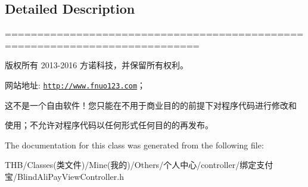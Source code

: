 \subsection{Detailed Description}
============================================================================

版权所有 2013-\/2016 方诺科技，并保留所有权利。

网站地址\+: \href{http://www.fnuo123.com}{\tt http\+://www.\+fnuo123.\+com}； 



这不是一个自由软件！您只能在不用于商业目的的前提下对程序代码进行修改和

使用；不允许对程序代码以任何形式任何目的的再发布。 

 

The documentation for this class was generated from the following file\+:\begin{DoxyCompactItemize}
\item 
T\+H\+B/\+Classes(类文件)/\+Mine(我的)/\+Others/个人中心/controller/绑定支付宝/Blind\+Ali\+Pay\+View\+Controller.\+h\end{DoxyCompactItemize}
